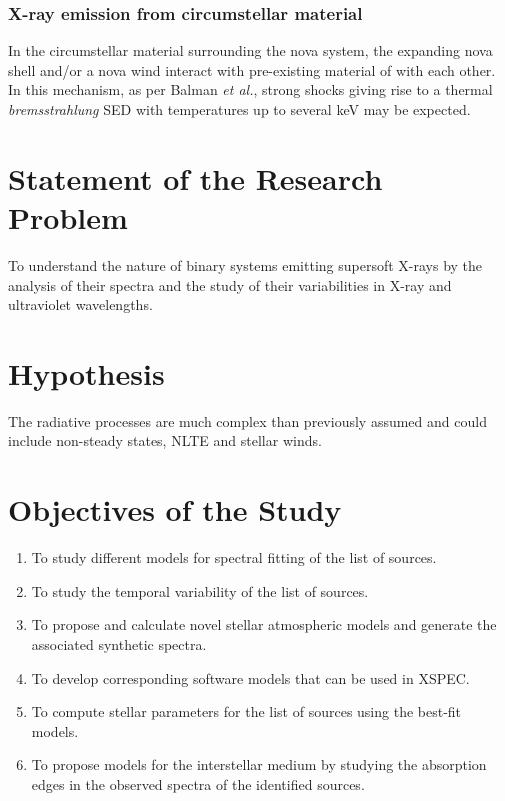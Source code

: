 			\subsubsection{X-ray emission from circumstellar material}
				In the circumstellar material surrounding the nova system, the expanding nova shell and/or a nova wind interact with pre-existing material of with each other. In this mechanism, as per Balman \emph{et al.}\cite{balman98}, strong shocks giving rise to a thermal \emph{bremsstrahlung} SED with temperatures up to several keV may be expected.

    \section{Statement of the Research Problem} \label{introduction:problem_statement}
    	To understand the nature of binary systems emitting supersoft X-rays by the analysis of their spectra and the study of their variabilities in X-ray and ultraviolet wavelengths.
        
    \section{Hypothesis} \label{introduction:hypothesis}
    	The radiative processes are much complex than previously assumed and could include non-steady states, NLTE and stellar winds.
    
    \section{Objectives of the Study} \label{introduction:objectives}
    	\begin{enumerate}
			\item To study different models for spectral fitting of the list of sources.
			\item To study the temporal variability of the list of sources.
			\item To propose and calculate novel stellar atmospheric models and generate the associated synthetic spectra.
			\item To develop corresponding software models that can be used in XSPEC.
			\item To compute stellar parameters for the list of sources using the best-fit models.
			\item To propose models for the interstellar medium by studying the absorption edges in the observed spectra of the identified sources.
		\end{enumerate}
    
